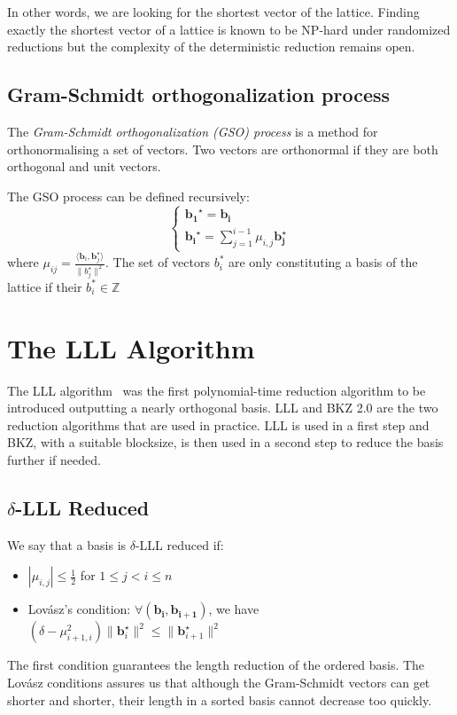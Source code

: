 \documentclass[10pt, a4paper]{article}
\renewcommand{\vec}[1]{\mathbf{#1}}
\begin{document}
In other words, we are looking for the shortest vector of the lattice. Finding exactly the shortest vector of a lattice is known to be NP-hard under randomized reductions\cite{Ajtai:1998:SVP} but the complexity of the deterministic reduction remains open.

\subsection{Gram-Schmidt orthogonalization process}
The \emph{Gram-Schmidt orthogonalization (\emph GSO) process} is a method for orthonormalising a set of vectors. Two vectors are orthonormal if they are both orthogonal and unit vectors. 

The GSO process  can be defined recursively:
\[
\begin{cases}
\vec{b_1}^{\star} = \vec{b_i}  \\
\vec{b_i}^{\star} = \displaystyle\sum^{i-1}_{j=1} \mu_{i,j} \vec{b_j^\star}
\end{cases}
\]
where $\mu_{ij} = \frac{\langle \vec{b}_i, \vec{b}_j^\star \rangle}{\| b_j^\star\|^2}$. The set of vectors $b_i^*$ are only constituting a basis of the lattice if their $b_i^* \in \mathbb{Z}$

\section{The LLL Algorithm}

The LLL algorithm~\cite{lllpaper} was the first polynomial-time reduction algorithm to be introduced outputting a nearly orthogonal basis. LLL and BKZ 2.0 are the two reduction algorithms that are used in practice. LLL is used in a first step and BKZ, with a suitable blocksize, is then used in a second step to reduce the basis further if needed.

\subsection{$\delta$-LLL Reduced}
We say that a basis is $\delta$-LLL reduced if:
\begin{itemize}
\item $| \mu_{i,j}| \leq \frac{1}{2} $ for $1 \leq j < i \leq n$
\item Lovász's condition: $\forall (\vec{b_i, b_{i+1}})$, we have $(\delta - \mu^2_{i+1,i}) \|\vec{b}^{\star}_{i}\|^2 \leq \| \vec{b}^{\star}_{i+1} \|^2$
\end{itemize}

The first condition guarantees the length reduction of the ordered basis.
The Lovász conditions assures us that although the Gram-Schmidt vectors can get shorter and shorter, their length in a sorted basis cannot decrease too quickly.
\end{document}
